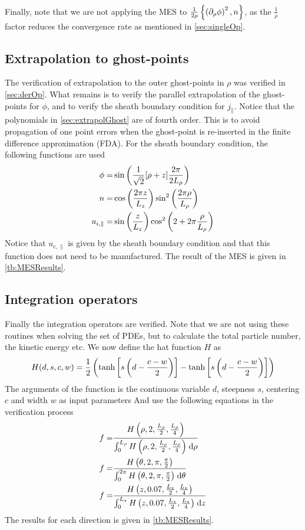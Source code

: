 Finally, note that we are not applying the MES to $\frac{1}{2\rho}\left\{\left(\partial_{\rho} \phi\right)^2,n\right\}$, as the $\frac{1}{\rho}$ factor reduces the convergence rate as mentioned in \cref{sec:singleOp}.

\subsection{Extrapolation to ghost-points}
%
The verification of extrapolation to the outer ghost-points in $\rho$ was verified in \cref{sec:derOp}.
What remains is to verify the parallel extrapolation of the ghost-points for $\phi$, and to verify the sheath boundary condition for $j_{\|}$.
Notice that the polynomials in \cref{sec:extrapolGhost} are of fourth order.
This is to avoid propagation of one point errors when the ghost-point is re-inserted in the finite difference approximation (FDA).
For the sheath boundary condition, the following functions are used
%
\begin{align}
    \phi =& \sin\left(\frac{1}{\sqrt{2}}[\rho + z]\frac{2\pi}{2L_\rho}\right)
    \label{eq:MESPhiSheath}
    \\
    n =& \cos\left(\frac{2\pi z}{L_z}\right)\sin^2\left(\frac{2\pi\rho}{L_\rho}\right)
    \label{eq:MESNSheath}
    \\
    u_{i, \|} =& \sin\left(\frac{z}{L_z}\right)\cos^2\left(2+2\pi\frac{\rho}{L_\rho}\right)
    \label{eq:MEUISheath}
\end{align}
%
Notice that $u_{e,\|}$ is given by the sheath boundary condition and that this function does not need to be manufactured.
The result of the MES is given in \cref{tb:MESResults}.

\subsection{Integration operators}
%
Finally the integration operators are verified.
Note that we are not using these routines when solving the set of PDEs, but to calculate the total particle number, the kinetic energy etc.
We now define the hat function $H$ as
%
\begin{align}
    H(d,s,c,w) = \frac{1}{2}\left(\tanh\left[s\left(d-\frac{c-w}{2}\right)\right]-\tanh\left[s\left(d-\frac{c-w}{2}\right)\right]\right)
    \label{eq:hat}
\end{align}
%
The arguments of the function is the continuous variable $d$, steepness $s$, centering $c$ and width $w$ as input parameters
And use the following equations in the verification process
%
\begin{align}
f =& \frac{H\left(\rho, 2,\frac{L_\rho}{2}, \frac{L_\rho}{4}\right)}{\int_{0}^{L_\rho} {H\left(\rho, 2,\frac{L_\rho}{2}, \frac{L_\rho}{4}\right)} \; \text{d} {\rho}}
\label{eq:MESRhoInt}
\\
f =& \frac{H\left(\theta, 2,\pi, \frac{\pi}{2}\right)}{\int_{0}^{2\pi} {H\left(\theta, 2,\pi, \frac{\pi}{2}\right)} \; \text{d} {\theta}}
\label{eq:MESThetaInt}
\\
f =& \frac{H\left(z, 0.07,\frac{L_z}{2}, \frac{L_z}{4}\right)}{\int_{0}^{L_z} {H\left(z, 0.07,\frac{L_z}{2}, \frac{L_z}{4}\right)} \; \text{d} {z}}
\label{eq:MESZInt}
\end{align}
%
The results for each direction is given in \cref{tb:MESResults}.

